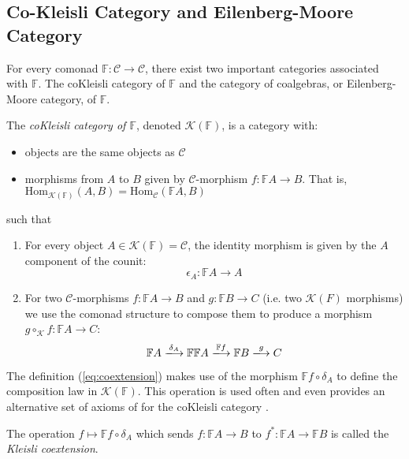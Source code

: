 \subsection{Co-Kleisli Category and Eilenberg-Moore Category}
For every comonad $\mathbb{F}:\mathcal{C} \longrightarrow \mathcal{C}$, there exist two important categories associated with $\mathbb{F}$. The coKleisli category of $\mathbb{F}$ and the category of coalgebras, or Eilenberg-Moore category, of $\mathbb{F}$. 
\begin{defn}
The \textit{coKleisli category of $\mathbb{F}$}, denoted $\mathcal{K}(\mathbb{F})$, is a category with:
\begin{itemize}
    \item objects are the same objects as $\mathcal{C}$
    \item morphisms from $A$ to $B$ given by $\mathcal{C}$-morphism $f:\mathbb{F}A \longrightarrow B$. That is, $\text{Hom}_{\mathcal{K}(\mathbb{F})}(A,B) = \text{Hom}_{\mathcal{C}}(\mathbb{F}A,B)$
\end{itemize}
such that 
\begin{enumerate}[label=(\arabic*)]
    \item For every object $A \in \mathcal{K}(\mathbb{F}) = \mathcal{C}$, the identity morphism is given by the $A$ component of the counit:  
    \begin{equation}
        \epsilon_{A}:\mathbb{F}A \longrightarrow A
    \end{equation}
    \item For two $\mathcal{C}$-morphisms $f:\mathbb{F}A \longrightarrow B$ and $g:\mathbb{F}B \longrightarrow C$ (i.e. two $\mathcal{K}(F)$ morphisms) we use the comonad structure to compose them to produce a morphism $g \circ_{\mathcal{K}} f:\mathbb{F}A \longrightarrow C$:
    \begin{equation} 
        \mathbb{F}A \xlongrightarrow{\delta_{A}} \mathbb{F}\mathbb{F}A \xlongrightarrow{\mathbb{F}f} \mathbb{F}B \xlongrightarrow{g} C 
    \label{eq:coextension}
    \end{equation}
\end{enumerate}
\end{defn}
The definition (\ref{eq:coextension}) makes use of the morphism $\mathbb{F}f \circ \delta_{A}$ to define the composition law in $\mathcal{K}(\mathbb{F})$. This operation is used often and even provides an alternative set of axioms of for the coKleisli category \cite{Moggi1991}. 
\begin{defn}
The operation $f \mapsto \mathbb{F}f \circ \delta_{A}$ which sends $f:\mathbb{F}A \longrightarrow B$ to $f^{*}: \mathbb{F}A \longrightarrow \mathbb{F}B$ is called the \textit{Kleisli coextension}. 
\end{defn}
